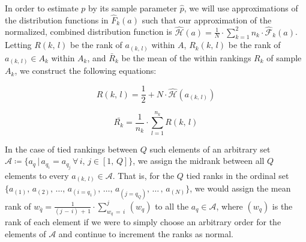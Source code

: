 \documentclass[pdflatex,sn-mathphys-num]{sn-jnl}
\theoremstyle{thmstyleone}
\theoremstyle{thmstyletwo}
\theoremstyle{thmstylethree}
\begin{document}
            \vspace{5pt}
    
            \par In order to estimate $p$ by its sample parameter $\hat{p}$, we will use approximations of the distribution functions in $\hat{F}_{k}(a)$ such that our approximation of the normalized, combined distribution function is $\hat{\mathcal{H}}(a) = \frac{1}{N} \cdot \sum_{k=1}^{2} n_{k} \cdot \hat{\mathcal{F}}_{k}(a)$. Letting $R{(k, \, l)}$ be the rank of $a_{(k, \, l)}$ within $A$, $R_{k}(k, \, l)$ be the rank of $a_{(k, \, l)} \in A_{k}$ within $A_{k}$, and $\bar{R}_{k}$ be the mean of the within rankings $R_{k}$ of sample $A_{k}$, we construct the following equations:
    
                \vspace{5pt}
                
                \begin{equation}
                    R{(k, \, l)} = \frac{1}{2} + N \cdot \hat{\mathcal{H}}(a_{(k, \, l)}) 
                \end{equation}
    
                \vspace{10pt}
    
                \begin{equation}
                    \bar{R_{k}} = \frac{1}{n_{k}} \cdot \sum_{l=1}^{n_{k}} R{(k, \, l)}
                \end{equation}
    
                \vspace{10pt}
    
            \noindent In the case of tied rankings between $Q$ such elements of an arbitrary set $\mathcal{A} \coloneqq \lbrace a_{q} \, | \,  a_{q_{i}} = a_{q_{j}} \, \forall \, i, \, j \in [1, \, Q] \rbrace$, we assign the midrank between all $Q$ elements to every $a_{(k, \, l)} \in \mathcal{A}$. That is, for the $Q$ tied ranks in the ordinal set $\lbrace a_{(1)}, \, a_{(2)}, \, \dots ,\, a_{(i = q_{1})}, \, \dots ,\, a_{(j = q_{Q})}, \, \dots \,,\, a_{(N)}\rbrace$, we would assign the mean rank of $w_{\bar{q}} = \frac{1}{(j \, - \, i) \, + \, 1} \cdot \sum_{w_{q} \, = \, i}^{j} \, (w_{q})$ to all the $a_{q} \in \mathcal{A}$, where $(w_{q})$ is the rank of each element if we were to simply choose an arbitrary order for the elements of $\mathcal{A}$ and continue to increment the ranks as normal.
    
            \vspace{5pt}
    
\end{document}
